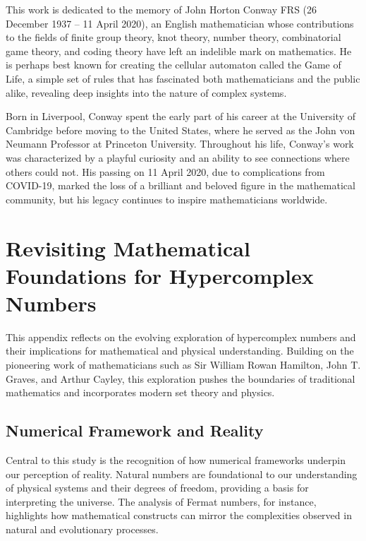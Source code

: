\documentclass[12pt]{article}
\begin{document}
This work is dedicated to the memory of John Horton Conway FRS (26 December 1937 – 11 April 2020), an English mathematician whose contributions to the fields of finite group theory, knot theory, number theory, combinatorial game theory, and coding theory have left an indelible mark on mathematics. He is perhaps best known for creating the cellular automaton called the Game of Life, a simple set of rules that has fascinated both mathematicians and the public alike, revealing deep insights into the nature of complex systems.

Born in Liverpool, Conway spent the early part of his career at the University of Cambridge before moving to the United States, where he served as the John von Neumann Professor at Princeton University. Throughout his life, Conway’s work was characterized by a playful curiosity and an ability to see connections where others could not. His passing on 11 April 2020, due to complications from COVID-19, marked the loss of a brilliant and beloved figure in the mathematical community, but his legacy continues to inspire mathematicians worldwide.

\appendix

\section{Revisiting Mathematical Foundations for Hypercomplex Numbers}

This appendix reflects on the evolving exploration of hypercomplex numbers and their implications for mathematical and physical understanding. Building on the pioneering work of mathematicians such as Sir William Rowan Hamilton, John T. Graves, and Arthur Cayley, this exploration pushes the boundaries of traditional mathematics and incorporates modern set theory and physics.

\subsection{Numerical Framework and Reality}

Central to this study is the recognition of how numerical frameworks underpin our perception of reality. Natural numbers are foundational to our understanding of physical systems and their degrees of freedom, providing a basis for interpreting the universe. The analysis of Fermat numbers, for instance, highlights how mathematical constructs can mirror the complexities observed in natural and evolutionary processes.
\end{document}
